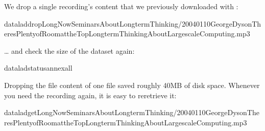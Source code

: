 \sphinxAtStartPar
We drop a single recording’s content that we previously downloaded with
:

\begin{sphinxVerbatim}[commandchars=\\\{\}]
dataladdropLong\PYGZus{}Now\PYGZus{}\PYGZus{}Seminars\PYGZus{}About\PYGZus{}Long\PYGZus{}term\PYGZus{}Thinking/2004\PYGZus{}01\PYGZus{}10\PYGZus{}\PYGZus{}George\PYGZus{}Dyson\PYGZus{}\PYGZus{}There\PYGZus{}s\PYGZus{}Plenty\PYGZus{}of\PYGZus{}Room\PYGZus{}at\PYGZus{}the\PYGZus{}Top\PYGZus{}\PYGZus{}Long\PYGZus{}term\PYGZus{}Thinking\PYGZus{}About\PYGZus{}Large\PYGZus{}scale\PYGZus{}Computing.mp3
\end{sphinxVerbatim}

\sphinxAtStartPar
… and check the size of the dataset again:

\begin{sphinxVerbatim}[commandchars=\\\{\}]
dataladstatus\PYGZhy{}\PYGZhy{}annexall
\end{sphinxVerbatim}

\sphinxAtStartPar
Dropping the file content of one  file saved roughly 40MB of disk space.
Whenever you need the recording again, it is easy to re\sphinxhyphen{}retrieve it:

\begin{sphinxVerbatim}[commandchars=\\\{\}]
dataladgetLong\PYGZus{}Now\PYGZus{}\PYGZus{}Seminars\PYGZus{}About\PYGZus{}Long\PYGZus{}term\PYGZus{}Thinking/2004\PYGZus{}01\PYGZus{}10\PYGZus{}\PYGZus{}George\PYGZus{}Dyson\PYGZus{}\PYGZus{}There\PYGZus{}s\PYGZus{}Plenty\PYGZus{}of\PYGZus{}Room\PYGZus{}at\PYGZus{}the\PYGZus{}Top\PYGZus{}\PYGZus{}Long\PYGZus{}term\PYGZus{}Thinking\PYGZus{}About\PYGZus{}Large\PYGZus{}scale\PYGZus{}Computing.mp3
\end{sphinxVerbatim}

